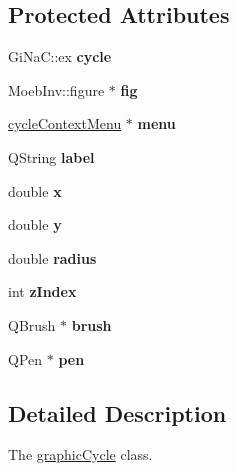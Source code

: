 \subsection*{Protected Attributes}
\begin{DoxyCompactItemize}
\item 
\mbox{\label{classgraphic_cycle_a4ac62f5c603c746ade147515c933b721}} 
Gi\+Na\+C\+::ex {\bfseries cycle}
\item 
\mbox{\label{classgraphic_cycle_af7f11bfbb4c2430929cced5e4155a0a7}} 
Moeb\+Inv\+::figure $\ast$ {\bfseries fig}
\item 
\mbox{\label{classgraphic_cycle_af21c2a80c6888dd755886bb0a70f6f93}} 
\mbox{\hyperlink{classcycle_context_menu}{cycle\+Context\+Menu}} $\ast$ {\bfseries menu}
\item 
\mbox{\label{classgraphic_cycle_a725399b2d4ea76cb3a6db6ceb06aafc4}} 
Q\+String {\bfseries label}
\item 
\mbox{\label{classgraphic_cycle_a55735deeb2167aeb4e100b7ba9af1f6e}} 
double {\bfseries x}
\item 
\mbox{\label{classgraphic_cycle_af618bc0dbf6b4eaa258ac4e3a94f5372}} 
double {\bfseries y}
\item 
\mbox{\label{classgraphic_cycle_ac69347cceb9271774768d2fd125a9b17}} 
double {\bfseries radius}
\item 
\mbox{\label{classgraphic_cycle_a429ba4157e69eef01c1937132c9e94b1}} 
int {\bfseries z\+Index}
\item 
\mbox{\label{classgraphic_cycle_aab0bc9d962360047ab356439bd19efe4}} 
Q\+Brush $\ast$ {\bfseries brush}
\item 
\mbox{\label{classgraphic_cycle_a70ec5162ff9af5ecf542b7aaaf13a9c2}} 
Q\+Pen $\ast$ {\bfseries pen}
\end{DoxyCompactItemize}


\subsection{Detailed Description}
The \mbox{\hyperlink{classgraphic_cycle}{graphic\+Cycle}} class. 

